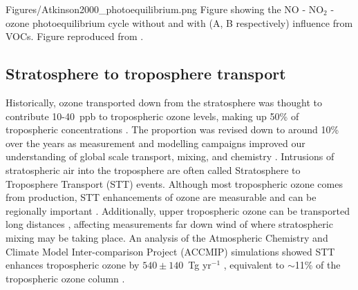       {Figures/Atkinson2000_photoequilibrium.png}
      {Figure showing the NO - NO$_2$ - ozone photoequilibrium cycle without and with (A, B respectively) influence from VOCs. Figure reproduced from \textcite{Atkinson2000}.}
      {\label{LR:O3:fig_Atkinson_photoequilibrium}}
    
    
    
  
  \subsection{Stratosphere to troposphere transport}
    \label{LR:O3:STT}
    Historically, ozone transported down from the stratosphere was thought to contribute 10-40~ppb to tropospheric ozone levels, making up 50\% of tropospheric concentrations \parencite{Atkinson2000, Stohl2003}.
    The proportion was revised down to around 10\% over the years as measurement and modelling campaigns improved our understanding of global scale transport, mixing, and chemistry \parencite{Guenther2006,Monks2015}.
    Intrusions of stratospheric air into the troposphere are often called Stratosphere to Troposphere Transport (STT) events.
    Although most tropospheric ozone comes from production, STT enhancements of ozone are measurable and can be regionally important \parencite[eg.][]{Jacobson2000,Lelieveld2009,Kuang2017}.
    Additionally, upper tropospheric ozone can be transported long distances \parencite{Cooper2004}, affecting measurements far down wind of where stratospheric mixing may be taking place.
    An analysis of the Atmospheric Chemistry and Climate Model Inter-comparison Project (ACCMIP) simulations showed STT enhances tropospheric ozone by $540\pm140$~Tg yr$^{-1}$ \parencite{Young2013}, equivalent to $\sim$11\% of the tropospheric ozone column \parencite{Monks2015}.
    
